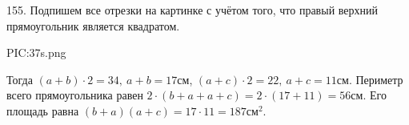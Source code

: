 155. Подпишем все отрезки на картинке с учётом того, что правый верхний прямоугольник является квадратом.
\begin{center}
{{PIC:37s.png}}
\end{center}
Тогда $(a+b)\cdot2=34,\ a+b=17$см, $(a+c)\cdot2=22,\ a+c=11$см. Периметр всего прямоугольника равен $2\cdot(b+a+a+c)=2\cdot(17+11)=56$см. Его площадь равна $(b+a)(a+c)=17\cdot11=187\text{см}^2.$\newpage\noindent

